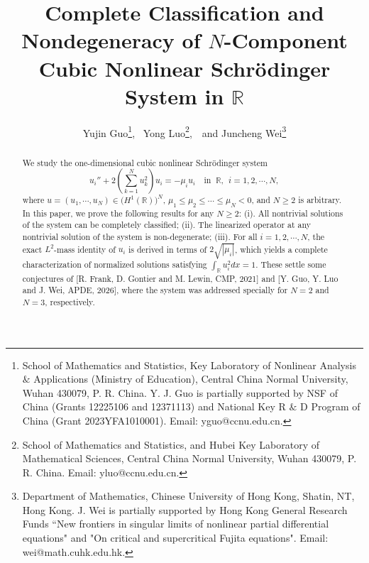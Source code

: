 \documentclass[11pt]{article}
\title{}
\author{}
\numberwithin{equation}{section}
\newcommand{\R}{{\mathbb{R}}}
\theoremstyle{definition}
\begin{document}
\title{Complete Classification and Nondegeneracy of $N$-Component Cubic Nonlinear Schr\"{o}dinger System  in $\R$}
\author{Yujin Guo\thanks{School of Mathematics and Statistics,  Key Laboratory of Nonlinear Analysis $\&$ Applications (Ministry of Education), Central China Normal University, Wuhan 430079, P. R. China. Y. J. Guo is partially supported by  NSF of China
(Grants 12225106 and 12371113) and National Key R $\&$ D Program of China (Grant 2023YFA1010001). Email: yguo@ccnu.edu.cn. }, \  Yong Luo\thanks{School of Mathematics and Statistics, and Hubei Key Laboratory of
Mathematical Sciences,  Central China Normal University, Wuhan 430079, P. R. China. Email: yluo@ccnu.edu.cn.},\ \,  and\; Juncheng Wei\thanks{Department of Mathematics, Chinese University of Hong Kong, Shatin, NT, Hong Kong. J. Wei is partially supported  by   Hong Kong General Research Funds ``New frontiers in singular limits of nonlinear partial differential equations" and "On critical and supercritical Fujita equations". Email: wei@math.cuhk.edu.hk.}  }





\date{}


\smallbreak \maketitle





\begin{abstract}
We study the one-dimensional cubic nonlinear Schr\"{o}dinger system
\[
u_i''+2\left(\sum_{k=1}^N u_k^2\right)u_i=-\mu_i u_i
\quad \mbox{in } \ \mathbb R,\ \ i=1,2,\cdots,N,
\]
where  $u=(u_1,\cdots,u_N)\in \big(H^1(\mathbb{R})\big)^N$, $\mu_1\leq\mu_2\leq\cdots\leq\mu_N<0$, and $N\geq 2$ is arbitrary. In this paper, we prove the following results for any $N\ge 2$: (i). All nontrivial solutions of the system can be completely classified; (ii). The linearized operator at any nontrivial solution of the system is non-degenerate; (iii).  For all $i=1, 2,\cdots, N$, the exact $L^2$-mass identity of $u_i$ is derived in terms of $2\sqrt {|\mu_i|}$, which yields a complete characterization of normalized solutions satisfying $\int_{\mathbb{R}}u_i^2dx=1$. These settle some conjectures of [R. Frank, D. Gontier and M. Lewin, CMP, 2021] and [Y. Guo, Y. Luo and J. Wei, APDE, 2026], where the system was addressed specially for $N=2$ and $N=3$, respectively.
\end{abstract}
\end{document}
